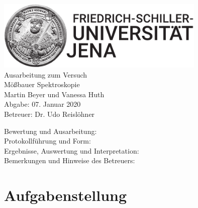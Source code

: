 \documentclass[a4paper,twoside,final]{article}
\begin{document}
\setlength{\marginparsep}{2em}
\renewcommand{\theequation}{\arabic{section}.\arabic{equation}}
\renewcommand{\thefigure}{\arabic{section}.\arabic{figure}}
\renewcommand{\thetable}{\arabic{section}.\arabic{table}}

\begin{center}
\thispagestyle{empty}
  \includegraphics[width=0.75\textwidth]{../UniJena_BildWortMarke_black.pdf}\\[4em]
  \Large
  Ausarbeitung zum Versuch\\[2em]
  \Huge
  Mößbauer Spektroskopie\\
  \vspace{2cm}
  \Large
  Martin Beyer und Vanessa Huth\\[2em]
  Abgabe: 07. Januar 2020\\[2em]
  Betreuer: Dr. Udo Reislöhner\\[5em]
  \begin{flushleft}
  	Bewertung und Ausarbeitung:\\[2em]
		Protokollführung und Form:\\[1em]
		Ergebnisse, Auswertung und Interpretation:\\[1em]
		Bemerkungen und Hinweise des Betreuers:
  \end{flushleft}
\end{center}
\clearpage

\pagestyle{fancy}
\renewcommand{\headrulewidth}{0pt}
\renewcommand{\footrulewidth}{0.5pt}
\renewcommand{\sectionmark}[1]{\markright{#1}}
\fancyhead[RE,LO]{\rightmark}
\fancyfoot[LE,RO]{\bfseries\thepage}
\renewcommand{\headrulewidth}{0.5pt}
\renewcommand{\footrulewidth}{0.5pt}

\setcounter{equation}{0}
\setcounter{figure}{0}

\tableofcontents
\newpage
\section{Aufgabenstellung} \label{sec:Aufgabenstellung}
\end{document}
